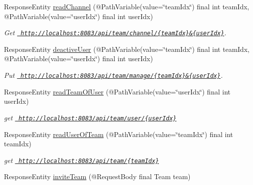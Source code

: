 \begin{DoxyCompactItemize}
Response\+Entity \mbox{\hyperlink{classcom_1_1aomc_1_1coop_1_1controller_1_1_team_controller_a890d22a6a53400482037c0587483b67d}{read\+Channel}} (@Path\+Variable(value=\char`\"{}team\+Idx\char`\"{}) final int team\+Idx, @Path\+Variable(value=\char`\"{}user\+Idx\char`\"{}) final int user\+Idx)
\begin{DoxyCompactList}\small\item\em Get \href{http://localhost:8083/api/team/channel/{teamIdx}&{userIdx}}{\texttt{ http\+://localhost\+:8083/api/team/channel/\{team\+Idx\}\&\{user\+Idx\}}}. \end{DoxyCompactList}\item 
Response\+Entity \mbox{\hyperlink{classcom_1_1aomc_1_1coop_1_1controller_1_1_team_controller_a0458b6213d34ba925524eaf1471961fd}{deactive\+User}} (@Path\+Variable(value=\char`\"{}team\+Idx\char`\"{}) final int team\+Idx, @Path\+Variable(value=\char`\"{}user\+Idx\char`\"{}) final int user\+Idx)
\begin{DoxyCompactList}\small\item\em Put \href{http://localhost:8083/api/team/manage/{teamIdx}&{userIdx}}{\texttt{ http\+://localhost\+:8083/api/team/manage/\{team\+Idx\}\&\{user\+Idx\}}}. \end{DoxyCompactList}\item 
Response\+Entity \mbox{\hyperlink{classcom_1_1aomc_1_1coop_1_1controller_1_1_team_controller_a6a669d703c8444c0ff326e8fc8e9b774}{read\+Team\+Of\+User}} (@Path\+Variable(value=\char`\"{}user\+Idx\char`\"{}) final int user\+Idx)
\begin{DoxyCompactList}\small\item\em get \href{http://localhost:8083/api/team/user/{userIdx}}{\texttt{ http\+://localhost\+:8083/api/team/user/\{user\+Idx\}}} \end{DoxyCompactList}\item 
Response\+Entity \mbox{\hyperlink{classcom_1_1aomc_1_1coop_1_1controller_1_1_team_controller_a422d0eed591df12749b1dcdf9bdb606a}{read\+User\+Of\+Team}} (@Path\+Variable(value=\char`\"{}team\+Idx\char`\"{}) final int team\+Idx)
\begin{DoxyCompactList}\small\item\em get \href{http://localhost:8083/api/team/{teamIdx}}{\texttt{ http\+://localhost\+:8083/api/team/\{team\+Idx\}}} \end{DoxyCompactList}\item 
Response\+Entity \mbox{\hyperlink{classcom_1_1aomc_1_1coop_1_1controller_1_1_team_controller_ae2bf50a2db266b377c7d7cbdf178231d}{invite\+Team}} (@Request\+Body final Team team)

\end{DoxyCompactItemize}
